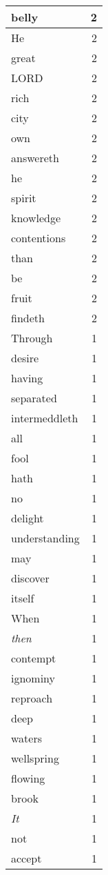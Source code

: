 \begin{center}
\begin{longtable}{l|r}
belly & 2\\ \hline 
He & 2\\ \hline 
great & 2\\ \hline 
LORD & 2\\ \hline 
rich & 2\\ \hline 
city & 2\\ \hline 
own & 2\\ \hline 
answereth & 2\\ \hline 
he & 2\\ \hline 
spirit & 2\\ \hline 
knowledge & 2\\ \hline 
contentions & 2\\ \hline 
than & 2\\ \hline 
be & 2\\ \hline 
fruit & 2\\ \hline 
findeth & 2\\ \hline 
Through & 1\\ \hline 
desire & 1\\ \hline 
having & 1\\ \hline 
separated & 1\\ \hline 
intermeddleth & 1\\ \hline 
all & 1\\ \hline 
fool & 1\\ \hline 
hath & 1\\ \hline 
no & 1\\ \hline 
delight & 1\\ \hline 
understanding & 1\\ \hline 
may & 1\\ \hline 
discover & 1\\ \hline 
itself & 1\\ \hline 
When & 1\\ \hline 
\emph{then} & 1\\ \hline 
contempt & 1\\ \hline 
ignominy & 1\\ \hline 
reproach & 1\\ \hline 
deep & 1\\ \hline 
waters & 1\\ \hline 
wellspring & 1\\ \hline 
flowing & 1\\ \hline 
brook & 1\\ \hline 
\emph{It} & 1\\ \hline 
not & 1\\ \hline 
accept & 1\\ \hline 

\end{longtable}
\end{center}
